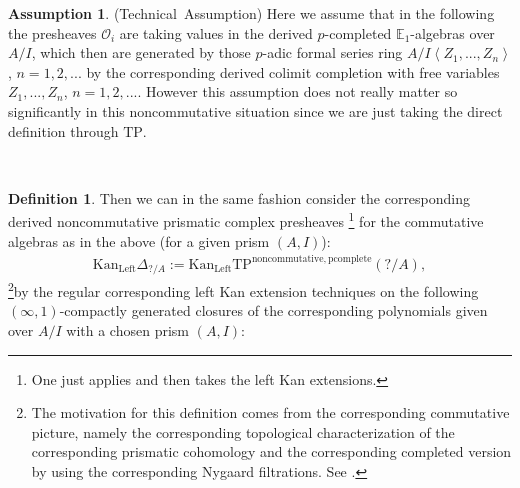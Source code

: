 \documentclass[11pt]{book}
\theoremstyle{definition}
\newtheorem{definition}[theorem]{Definition}
\numberwithin{equation}{section}
\newtheorem{assumption}[theorem]{Assumption}
\begin{document}
\begin{assumption}\mbox{(Technical Assumption)} 
Here we assume that in the following the presheaves $\mathcal{O}_i$ are taking values in the derived $p$-completed $\mathbb{E}_1$-algebras over $A/I$, which then are generated by those $p$-adic formal series ring $A/I\left<Z_1,...,Z_n\right>$, $n=1,2,...$ by the corresponding derived colimit completion with free variables $Z_1,...,Z_n$, $n=1,2,...$. However this assumption does not really matter so significantly in this noncommutative situation since we are just taking the direct definition through $\text{TP}$.  	
\end{assumption}





\

\begin{definition}
Then we can in the same fashion consider the corresponding derived noncommutative prismatic complex presheaves \cite[Construction 7.6]{12BS}\footnote{One just applies \cite[Construction 7.6]{12BS} and then takes the left Kan extensions.} for the commutative algebras as in the above (for a given prism $(A,I)$):
\begin{align}
\mathrm{Kan}_{\mathrm{Left}}\Delta_{?/A}:=\mathrm{Kan}_{\mathrm{Left}}\mathrm{TP}^\mathrm{noncommutative,pcomplete}(?/A),	
\end{align}
\footnote{The motivation for this definition comes from the corresponding commutative picture, namely the corresponding topological characterization of the corresponding prismatic cohomology and the corresponding completed version by using the corresponding Nygaard filtrations. See \cite[Theorem 1.13]{12BS}.}by the regular corresponding left Kan extension techniques on the following $(\infty,1)$-compactly generated closures of the corresponding polynomials given over $A/I$ with a chosen prism $(A,I)$:\\


\end{definition}
\end{document}
